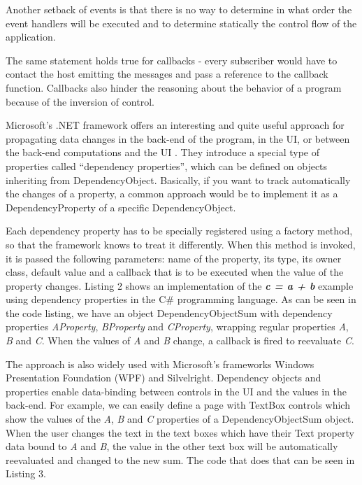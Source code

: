 \documentclass{sigplanconf}
\begin{document}
Another setback of events is that there is no way to determine in what order the event handlers will be executed and to determine statically the control flow of the application.

The same statement holds true for callbacks - every subscriber would have to contact the host emitting the messages and pass a reference to the callback function. Callbacks also hinder the reasoning about the behavior of a program because of the inversion of control.

Microsoft's .NET framework \cite{net} offers an interesting and quite useful approach for propagating data changes in the back-end of the program, in the UI, or between the back-end computations and the UI \cite{dp}. They introduce a special type of properties called ``dependency properties'', which can be defined on objects inheriting from DependencyObject. Basically, if you want to track automatically the changes of a property, a common approach would be to implement it as a DependencyProperty of a specific DependencyObject. 

Each dependency property has to be specially registered using a factory method, so that the framework knows to treat it differently. When this method is invoked, it is passed the following parameters: name of the property, its type, its owner class, default value and a callback that is to be executed when the value of the property changes. Listing 2 shows an implementation of the \textit{\textbf{c = a + b}} example using dependency properties in the C\# programming language. As can be seen in the code listing, we have an object DependencyObjectSum with dependency properties \textit{AProperty},\textit{ BProperty} and \textit{CProperty}, wrapping regular properties \textit{A}, \textit{B} and \textit{C}. When the values of \textit{A} and \textit{B} change, a callback is fired to reevaluate \textit{C}. 

The approach is also widely used with Microsoft's frameworks Windows Presentation Foundation (WPF) and Silvelright. Dependency objects and properties enable data-binding between controls in the UI and the values in the back-end. For example, we can easily define a page with TextBox controls which show the values of the \textit{A}, \textit{B} and \textit{C} properties of a DependencyObjectSum object. When the user changes the text in the text boxes which have their Text property data bound to \textit{A} and \textit{B}, the value in the other text box will be automatically reevaluated and changed to the new sum. The code that does that can be seen in Listing 3. 
\end{document}
